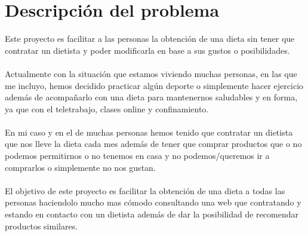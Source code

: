 \chapter{Descripción del problema}

Este proyecto es facilitar a las personas la obtención de una dieta sin tener que 
contratar un dietista y poder modificarla en base a sus gustos o posibilidades.
\\\\
Actualmente con la situación que estamos viviendo muchas personas, en las que me incluyo, hemos 
decidido practicar algún deporte o simplemente hacer ejercicio además de acompañarlo con una dieta 
para mantenernos saludables y en forma, ya que con el teletrabajo, clases online y confinamiento.
\\\\
En mi caso y en el de muchas personas hemos tenido que contratar un dietista que nos lleve la dieta 
cada mes además de tener que comprar productos que o no podemos permitirnos o no tenemos en casa y no 
podemos/queremos ir a comprarlos o simplemente no nos gustan.
\\\\
El objetivo de este proyecto es facilitar la obtención de una dieta a todas las personas haciendolo mucho 
mas cómodo consultando una web que contratando y estando en contacto con un dietista además de dar la posibilidad 
de recomendar productos similares.